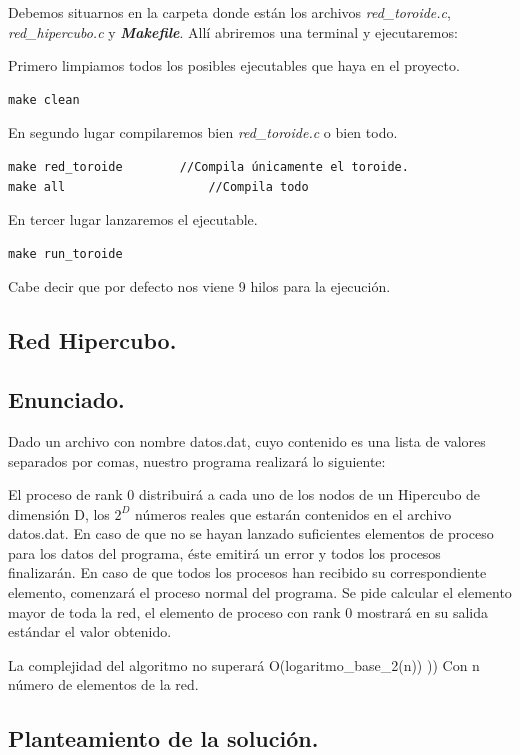 \documentclass{article}
\begin{document}
Debemos situarnos en la carpeta donde están los archivos \textit{red\_toroide.c}, \textit{red\_hipercubo.c} y \textit{\textbf{Makefile}}. Allí abriremos una terminal y ejecutaremos:
\begin{list}{•}{}
\item Primero limpiamos todos los posibles ejecutables que haya en el proyecto.
\begin{lstlisting}
make clean
\end{lstlisting}
\item En segundo lugar compilaremos bien \textit{red\_toroide.c} o bien todo.
\begin{lstlisting}
make red_toroide		//Compila únicamente el toroide.
make all					//Compila todo
\end{lstlisting}
\item En tercer lugar lanzaremos el ejecutable.
\begin{lstlisting}
make run_toroide
\end{lstlisting}
Cabe decir que por defecto nos viene 9 hilos para la ejecución.
\end{list}
 
\begin{center}
\section{Red Hipercubo.}
\end{center}
\subsection{Enunciado.}
Dado un archivo con nombre datos.dat, cuyo contenido es una lista de valores separados por comas, nuestro programa realizará lo siguiente:

El proceso de rank 0 distribuirá a cada uno de los nodos de un Hipercubo de dimensión D, los $2^D$ números reales que estarán contenidos en el archivo datos.dat. En caso de que no se hayan lanzado suficientes elementos de proceso para los datos del programa, éste emitirá un error y todos los procesos finalizarán.
En caso de que todos los procesos han recibido su correspondiente elemento, comenzará el proceso normal del programa.
Se pide calcular el elemento mayor de toda la red, el elemento de proceso con rank 0 mostrará en su salida estándar el valor obtenido. 

La complejidad del algoritmo no superará O(logaritmo\_base\_2(n)) )) Con n número de elementos de la red.

\subsection{Planteamiento de la solución.}
\end{document}
